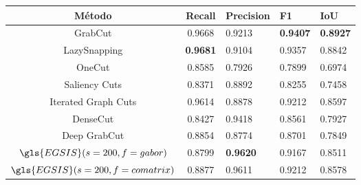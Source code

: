 \begin{table}[!h]
    \centering
  \begin{tabular}{cclll}
    \toprule
    \textbf{Método}                    & \textbf{Recall} & \textbf{Precision} & \textbf{F1}     & \textbf{IoU} \\
    \midrule \midrule
    GrabCut                            & 0.9668          & 0.9213             & \textbf{0.9407} & \textbf{0.8927}       \\
    LazySnapping                       & \textbf{0.9681} & 0.9104             & 0.9357          & 0.8842       \\
    OneCut                             & 0.8585          & 0.7926             & 0.7899          & 0.6974       \\
    Saliency Cuts                      & 0.8371          & 0.8892             & 0.8255          & 0.7458       \\
    Iterated Graph Cuts\footnotemark{} & 0.9614          & 0.8878             & 0.9212          & 0.8597       \\
    DenseCut                           & 0.8427          & 0.9418             & 0.8561          & 0.7927       \\
    Deep GrabCut                       & 0.8854          & 0.8774             & 0.8701          & 0.7849       \\
    $\gls{EGSIS}(s=200, f=gabor)$      & 0.8799          & \textbf{0.9620}    & 0.9167          & 0.8511       \\
    $\gls{EGSIS}(s=200, f=comatrix)$   & 0.8877          & 0.9611             & 0.9212          & 0.8578       \\
    \bottomrule
  \end{tabular}
\end{table}


